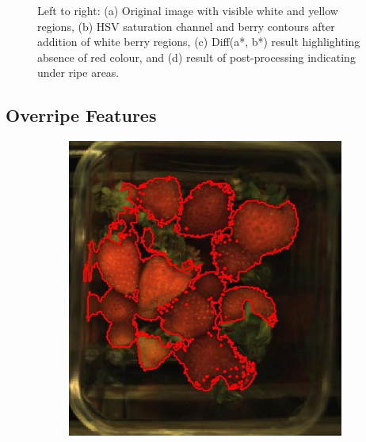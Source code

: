 \documentclass[fleqn,twoside,12pt]{report}
\begin{document}
\begin{figure}[ht]
	\caption{Left to right: (a) Original image with visible white and yellow regions, (b) HSV saturation channel and berry contours after addition of white berry regions, (c) Diff(a*, b*) result highlighting absence of red colour, and (d) result of post-processing indicating under ripe areas.}
	\label{fig:under ripe_process}
\end{figure}


\subsection{Overripe Features}

\begin{figure}[ht]
	\centering
	\begin{subfigure}{.30\textwidth}
		\centering
		\includegraphics[width=.9\linewidth]{over_berries.jpg}
		\caption{}
		\label{fig:over_berries}
	\end{subfigure}%
	\begin{subfigure}{.30\textwidth}
		\centering

\end{subfigure}
\end{figure}
\end{document}
